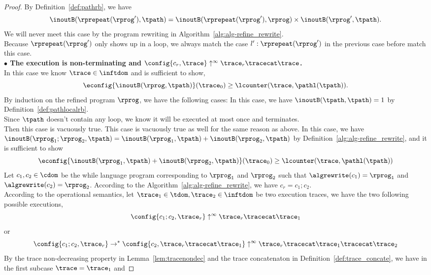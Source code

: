 \begin{proof}
By Definition~\ref{def:pathrb}, we have
\[
  \inoutB(\rprepeat(\rprog'), \tpath) = \inoutB(\rprepeat(\rprog'), \rprog) \times \inoutB(\rprog', \tpath).
\]
We will never meet this case by the program rewriting in Algorithm~\ref{alg:alg-refine_rewrite}.
\\
Because $\rprepeat(\rprog')$ only shows up in a loop, we always match the case $l' : \rprepeat(\rprog')$ in the previous case before match this case.
%
\\
\textbf{$\bullet$ The execution is non-terminating and {$\config{{c_r}, \trace} \uparrow^{\infty} \trace_r \tracecat \trace$}.} 
\\
 In this case we know $\trace \in \inftdom$ and is sufficient to show,
\[
  \econfig{\inoutB(\rprog, \tpath)}(\trace_0) \geq \lcounter(\trace, \pathl(\tpath)).
\]
By induction on the refined program $\rprog$,
we have the following cases:
\caseL{$\rprog = \tpath$}
In this case, we have $\inoutB(\tpath, \tpath) = 1$ by Definition~\ref{def:pathlocalrb}. 
\\
Since $\tpath$ doesn't contain any loop, we know it will be executed at most once and terminates.
\\
Then this case is vacuously true.
This case is vacuously true as well for the same reason as above.
In this case, we have $\inoutB(\rprog_1;\rprog_2, \tpath) = \inoutB(\rprog_1, \tpath) + \inoutB(\rprog_2, \tpath) $ by Definition~\ref{alg:alg-refine_rewrite}, and
it is sufficient to show
\[
  \econfig{\inoutB(\rprog_1, \tpath) + \inoutB(\rprog_2, \tpath)}(\trace_0) \geq \lcounter(\trace, \pathl(\tpath)) 
\]
Let $c_1, c_2 \in \cdom$ be the while language program corresponding to $\rprog_1$ and $\rprog_2$ such that $\algrewrite(c_1) = \rprog_1$ and $\algrewrite(c_2) = \rprog_2$.
According to the Algorithm~\ref{alg:alg-refine_rewrite}, we have $c_r = c_1; c_2$.
\\
According to the operational semantics, let $\trace_1 \in \tdom, \trace_2 \in \inftdom$ be two execution traces, we have the two following possible executions,
\[
  \config{c_1; c_2, \trace_r} \uparrow^{\infty} \trace_r \tracecat \trace_1
\]
or
\[
  \config{c_1; c_2, \trace_r} \to^* \config{c_2, \trace_r \tracecat \trace_1} \uparrow^{\infty} \trace_r \tracecat \trace_1 \tracecat \trace_2
\]
By the trace non-decreasing property in Lemma~\ref{lem:tracenondec} and the trace concatenaton in Definition~\ref{def:trace_concate}, we have in the first subcase $\trace = \trace_1$ and

\end{proof}
